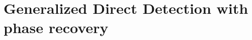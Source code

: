 \chapter{Generalized Direct Detection with phase recovery}
\newcommand{\PlabstImage}[1]{images/Tukey_Signaling/#1.pdf}





